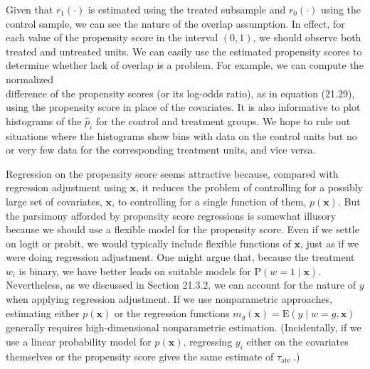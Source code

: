 \documentclass[10pt]{article}
\begin{document}
Given that $r_{1}(\cdot)$ is estimated using the treated subsample and $r_{0}(\cdot)$ using the control sample, we can see the nature of the overlap assumption. In effect, for each value of the propensity score in the interval $(0,1)$, we should observe both treated and untreated units. We can easily use the estimated propensity scores to determine whether lack of overlap is a problem. For example, we can compute the normalized\\
difference of the propensity scores (or its log-odds ratio), as in equation (21.29), using the propensity score in place of the covariates. It is also informative to plot histograms of the $\hat{p}_{i}$ for the control and treatment groups. We hope to rule out situations where the histograms show bins with data on the control units but no or very few data for the corresponding treatment units, and vice versa.

Regression on the propensity score seems attractive because, compared with regression adjustment using $\mathbf{x}$, it reduces the problem of controlling for a possibly large set of covariates, $\mathbf{x}$, to controlling for a single function of them, $p(\mathbf{x})$. But the parsimony afforded by propensity score regressions is somewhat illusory because we should use a flexible model for the propensity score. Even if we settle on logit or probit, we would typically include flexible functions of $\mathbf{x}$, just as if we were doing regression adjustment. One might argue that, because the treatment $w_{i}$ is binary, we have better leads on suitable models for $\mathrm{P}(w=1 \mid \mathbf{x})$. Nevertheless, as we discussed in Section 21.3.2, we can account for the nature of $y$ when applying regression adjustment. If we use nonparametric approaches, estimating either $p(\mathbf{x})$ or the regression functions $m_{g}(\mathbf{x})=\mathrm{E}(y \mid w=g, \mathbf{x})$ generally requires high-dimensional nonparametric estimation. (Incidentally, if we use a linear probability model for $p(\mathbf{x})$, regressing $y_{i}$ either on the covariates themselves or the propensity score gives the same estimate of $\tau_{\text {ate }}$.)
\end{document}
